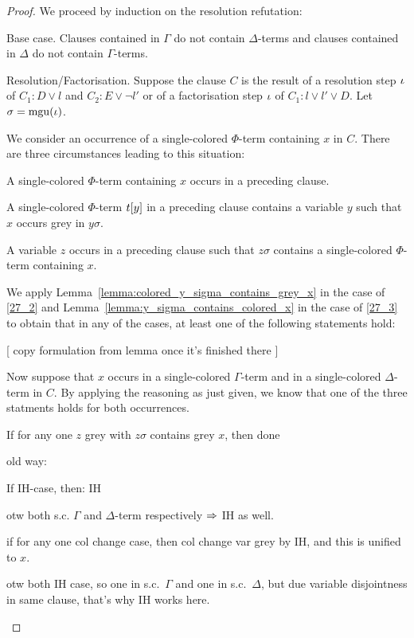 \documentclass[,%
	paper=a4,%
	DIV11, %
	twoside=false,%
	liststotoc,
	bibtotoc,
	draft=false,%
	numbers=noendperiod
]{scrartcl}
\begin{document}
\begin{proof}
	We proceed by induction on the resolution refutation:

	\begin{description}
		\item{}Base case.
			Clauses contained in $\Gamma$ do not contain $\Delta$-terms and clauses contained in $\Delta$ do not contain $\Gamma$-terms.

		\item{}Resolution/Factorisation.
			Suppose the clause $C$ is the result of a resolution step $\iota$ of $C_1: D \lor l$ and $C_2: E \lor \lnot l'$
			or of a factorisation step $\iota$ of $C_1: l \lor l' \lor D$.
			Let $\sigma = \operatorname{mgu}(\iota)$. 


			We consider an occurrence of a single-colored $\Phi$-term containing $x$ in $C$.
			There are three circumstances leading to this situation:
			\begin{compactenum}
				\item A single-colored $\Phi$-term containing $x$ occurs in a preceding clause.
				\item A single-colored $\Phi$-term $t[y]$ in a preceding clause contains a variable $y$ such that $x$ occurs grey in $y\sigma$. \label{27_2}
				\item A variable $z$ occurs in a preceding clause such that $z\sigma$ contains a single-colored $\Phi$-term containing $x$. \label{27_3}
			\end{compactenum}

			We apply Lemma~\ref{lemma:colored_y_sigma_contains_grey_x} in the case of \ref{27_2} and
			Lemma~\ref{lemma:y_sigma_contains_colored_x} in the case of \ref{27_3} to obtain that in any of the cases, at least one of the following statements hold:

			[ copy formulation from lemma once it's finished there ]

			Now suppose that $x$ occurs in a single-colored $\Gamma$-term and in a single-colored $\Delta$-term in $C$.
			By applying the reasoning as just given, we know that one of the three statments holds for both occurrences. 

			If for any one $z$ grey with $z\sigma$ contains grey $x$, then done

			{ \tiny

				old way: 

				If IH-case, then: IH

				otw both s.c. $\Gamma$ and $\Delta$-term respectively $\Rightarrow$ IH as well.

			}

			if for any one col change case, then col change var grey by IH, and this is unified to $x$.

			otw both IH case, so one in s.c.\ $\Gamma$ and one in s.c.\ $\Delta$, but due variable disjointness in same clause, that's why IH works here.
			\qedhere

	\end{description}
\end{proof}
\end{document}
